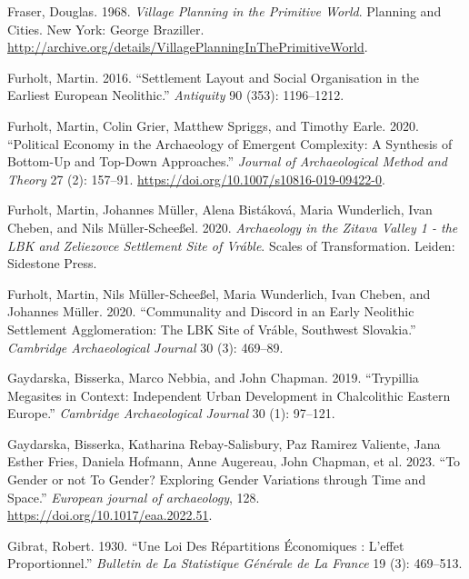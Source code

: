\documentclass[
  12pt,
  a4paper, twoside]{book}
\newlength{\cslhangindent}
\newlength{\cslentryspacingunit} %
\newenvironment{CSLReferences}[2] %
 {%
  \setlength{\parindent}{0pt}
  \ifodd #1
  \let\oldpar\par
  \def\par{\hangindent=\cslhangindent\oldpar}
  \fi
  \setlength{\parskip}{#2\cslentryspacingunit}
 }%
 {}
\begin{document}
\begin{CSLReferences}{1}{0}
\leavevmode{}%
Fraser, Douglas. 1968. \emph{Village Planning in the Primitive World}. Planning and Cities. New York: George Braziller. \url{http://archive.org/details/VillagePlanningInThePrimitiveWorld}.

\leavevmode{}%
Furholt, Martin. 2016. {``Settlement Layout and Social Organisation in the Earliest European Neolithic.''} \emph{Antiquity} 90 (353): 1196--1212.

\leavevmode{}%
Furholt, Martin, Colin Grier, Matthew Spriggs, and Timothy Earle. 2020. {``Political Economy in the Archaeology of Emergent Complexity: A Synthesis of Bottom-Up and Top-Down Approaches.''} \emph{Journal of Archaeological Method and Theory} 27 (2): 157--91. \url{https://doi.org/10.1007/s10816-019-09422-0}.

\leavevmode{}%
Furholt, Martin, Johannes Müller, Alena Bistáková, Maria Wunderlich, Ivan Cheben, and Nils Müller-Scheeßel. 2020. \emph{Archaeology in the Zitava Valley 1 - the LBK and Zeliezovce Settlement Site of Vráble}. Scales of Transformation. Leiden: Sidestone Press.

\leavevmode{}%
Furholt, Martin, Nils Müller-Scheeßel, Maria Wunderlich, Ivan Cheben, and Johannes Müller. 2020. {``Communality and Discord in an Early Neolithic Settlement Agglomeration: The LBK Site of Vráble, Southwest Slovakia.''} \emph{Cambridge Archaeological Journal} 30 (3): 469--89.

\leavevmode{}%
Gaydarska, Bisserka, Marco Nebbia, and John Chapman. 2019. {``Trypillia Megasites in Context: Independent Urban Development in Chalcolithic Eastern Europe.''} \emph{Cambridge Archaeological Journal} 30 (1): 97--121.

\leavevmode{}%
Gaydarska, Bisserka, Katharina Rebay-Salisbury, Paz Ramirez Valiente, Jana Esther Fries, Daniela Hofmann, Anne Augereau, John Chapman, et al. 2023. {``To Gender or not To Gender? Exploring Gender Variations through Time and Space.''} \emph{European journal of archaeology}, 128. \url{https://doi.org/10.1017/eaa.2022.51}.

\leavevmode{}%
Gibrat, Robert. 1930. {``Une Loi Des Répartitions Économiques : L'effet Proportionnel.''} \emph{Bulletin de La Statistique Générale de La France} 19 (3): 469--513.


\end{CSLReferences}
\end{document}
